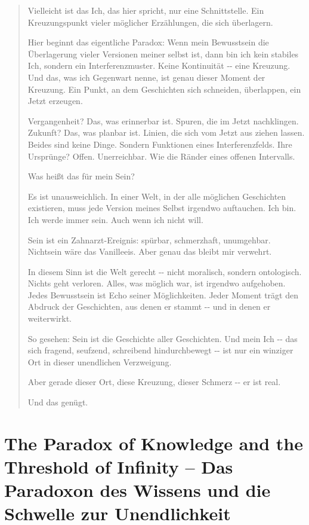 \documentclass[
  ngerman,
]{article}
\begin{document}
\begin{quote}
Vielleicht ist das Ich, das hier spricht, nur eine Schnittstelle. Ein
Kreuzungspunkt vieler möglicher Erzählungen, die sich überlagern.

Hier beginnt das eigentliche Paradox: Wenn mein Bewusstsein die
Überlagerung vieler Versionen meiner selbst ist, dann bin ich kein
stabiles Ich, sondern ein Interferenzmuster. Keine Kontinuität -\/- eine
Kreuzung. Und das, was ich Gegenwart nenne, ist genau dieser Moment der
Kreuzung. Ein Punkt, an dem Geschichten sich schneiden, überlappen, ein
Jetzt erzeugen.

Vergangenheit? Das, was erinnerbar ist. Spuren, die im Jetzt
nachklingen. Zukunft? Das, was planbar ist. Linien, die sich vom Jetzt
aus ziehen lassen. Beides sind keine Dinge. Sondern Funktionen eines
Interferenzfelds. Ihre Ursprünge? Offen. Unerreichbar. Wie die Ränder
eines offenen Intervalls.

Was heißt das für mein Sein?

Es ist unausweichlich. In einer Welt, in der alle möglichen Geschichten
existieren, muss jede Version meines Selbst irgendwo auftauchen. Ich
bin. Ich werde immer sein. Auch wenn ich nicht will.

Sein ist ein Zahnarzt-Ereignis: spürbar, schmerzhaft, unumgehbar.
Nichtsein wäre das Vanilleeis. Aber genau das bleibt mir verwehrt.

In diesem Sinn ist die Welt gerecht -\/- nicht moralisch, sondern
ontologisch. Nichts geht verloren. Alles, was möglich war, ist irgendwo
aufgehoben. Jedes Bewusstsein ist Echo seiner Möglichkeiten. Jeder
Moment trägt den Abdruck der Geschichten, aus denen er stammt -\/- und
in denen er weiterwirkt.

So gesehen: Sein ist die Geschichte aller Geschichten. Und mein Ich -\/-
das sich fragend, seufzend, schreibend hindurchbewegt -\/- ist nur ein
winziger Ort in dieser unendlichen Verzweigung.

Aber gerade dieser Ort, diese Kreuzung, dieser Schmerz -\/- er ist real.

Und das genügt.
\end{quote}

\section{\texorpdfstring{\textbf{The Paradox of Knowledge and the
Threshold of Infinity -- Das Paradoxon des Wissens und die Schwelle zur
Unendlichkeit}}{The Paradox of Knowledge and the Threshold of Infinity -- Das Paradoxon des Wissens und die Schwelle zur Unendlichkeit}}\label{the-paradox-of-knowledge-and-the-threshold-of-infinity-das-paradoxon-des-wissens-und-die-schwelle-zur-unendlichkeit}
\end{document}
